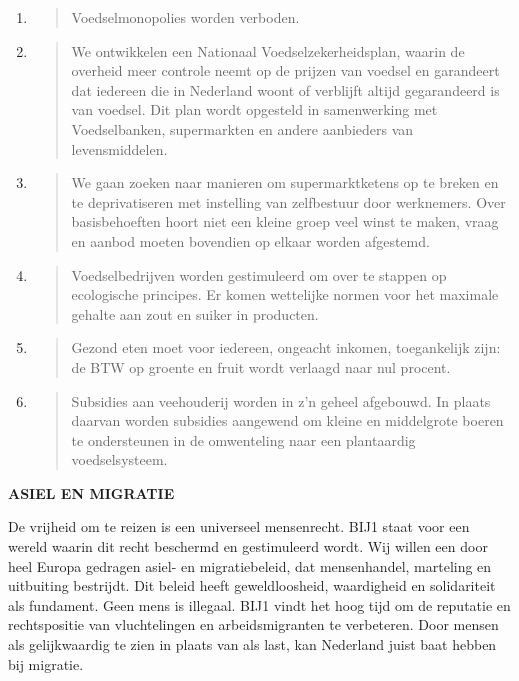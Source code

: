 \begin{enumerate}
\def\labelenumi{\arabic{enumi}.}
\item
  \begin{quote}
  Voedselmonopolies worden verboden.
  \end{quote}
\item
  \begin{quote}
  We ontwikkelen een Nationaal Voedselzekerheidsplan, waarin de overheid
  meer controle neemt op de prijzen van voedsel en garandeert dat
  iedereen die in Nederland woont of verblijft altijd gegarandeerd is
  van voedsel. Dit plan wordt opgesteld in samenwerking met
  Voedselbanken, supermarkten en andere aanbieders van levensmiddelen.
  \end{quote}
\item
  \begin{quote}
  We gaan zoeken naar manieren om supermarktketens op te breken en te
  deprivatiseren met instelling van zelfbestuur door werknemers. Over
  basisbehoeften hoort niet een kleine groep veel winst te maken, vraag
  en aanbod moeten bovendien op elkaar worden afgestemd.
  \end{quote}
\item
  \begin{quote}
  Voedselbedrijven worden gestimuleerd om over te stappen op ecologische
  principes. Er komen wettelijke normen voor het maximale gehalte aan
  zout en suiker in producten.
  \end{quote}
\item
  \begin{quote}
  Gezond eten moet voor iedereen, ongeacht inkomen, toegankelijk zijn:
  de BTW op groente en fruit wordt verlaagd naar nul procent.
  \end{quote}
\item
  \begin{quote}
  Subsidies aan veehouderij worden in z'n geheel afgebouwd. In plaats
  daarvan worden subsidies aangewend om kleine en middelgrote boeren te
  ondersteunen in de omwenteling naar een plantaardig voedselsysteem.
  \end{quote}
\end{enumerate}

\textbf{ASIEL EN MIGRATIE}

De vrijheid om te reizen is een universeel mensenrecht. BIJ1 staat voor
een wereld waarin dit recht beschermd en gestimuleerd wordt. Wij willen
een door heel Europa gedragen asiel- en migratiebeleid, dat
mensenhandel, marteling en uitbuiting bestrijdt. Dit beleid heeft
geweldloosheid, waardigheid en solidariteit als fundament. Geen mens is
illegaal. BIJ1 vindt het hoog tijd om de reputatie en rechtspositie van
vluchtelingen en arbeidsmigranten te verbeteren. Door mensen als
gelijkwaardig te zien in plaats van als last, kan Nederland juist baat
hebben bij migratie.

